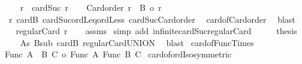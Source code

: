 \begin{isabellebody}
\ \ \isamarkupfalse%
\ {\isacharquery}{\kern0pt}r{\isacharprime}{\kern0pt}\ {\isacharequal}{\kern0pt}\ {\isachardoublequoteopen}cardSuc\ r{\isachardoublequoteclose}\isanewline
\ \ \isamarkupfalse%
\ {\isachardoublequoteopen}Card{\isacharunderscore}{\kern0pt}order\ {\isacharquery}{\kern0pt}r{\isacharprime}{\kern0pt}\ {\isasymand}\ {\isacharbar}{\kern0pt}B{\isacharbar}{\kern0pt}\ {\isacharless}{\kern0pt}o\ {\isacharquery}{\kern0pt}r{\isacharprime}{\kern0pt}{\isachardoublequoteclose}\isanewline
\ \ \isamarkupfalse%
\ r\ cardB\ cardSuc{\isacharunderscore}{\kern0pt}ordLeq{\isacharunderscore}{\kern0pt}ordLess\ cardSuc{\isacharunderscore}{\kern0pt}Card{\isacharunderscore}{\kern0pt}order\isanewline
\ \ card{\isacharunderscore}{\kern0pt}of{\isacharunderscore}{\kern0pt}Card{\isacharunderscore}{\kern0pt}order\ \isamarkupfalse%
\ blast\isanewline
\ \ \isamarkupfalse%
\ \isamarkupfalse%
\ {\isachardoublequoteopen}regularCard\ {\isacharquery}{\kern0pt}r{\isacharprime}{\kern0pt}{\isachardoublequoteclose}\isanewline
\ \ \isamarkupfalse%
\ assms\ \isamarkupfalse%
{\isacharparenleft}{\kern0pt}simp\ add{\isacharcolon}{\kern0pt}\ infinite{\isacharunderscore}{\kern0pt}cardSuc{\isacharunderscore}{\kern0pt}regularCard{\isacharparenright}{\kern0pt}\isanewline
\ \ \isamarkupfalse%
\ \isamarkupfalse%
\ {\isacharquery}{\kern0pt}thesis\isanewline
\ \ \isamarkupfalse%
\ As\ Bsub\ cardB\ regularCard{\isacharunderscore}{\kern0pt}UNION\ \isamarkupfalse%
\ blast\isanewline
{}\isamarkupfalse%
%
\endisatagproof
{\isafoldproof}%
%
\isadelimproof
%
\endisadelimproof
%
\isadelimdocument
%
\endisadelimdocument
%
\isatagdocument
%
\isamarkuptrue%
%
\endisatagdocument
{\isafolddocument}%
%
\isadelimdocument
%
\endisadelimdocument
{}\isamarkupfalse%
\ card{\isacharunderscore}{\kern0pt}of{\isacharunderscore}{\kern0pt}Func{\isacharunderscore}{\kern0pt}Times{\isacharcolon}{\kern0pt}\isanewline
{\isachardoublequoteopen}{\isacharbar}{\kern0pt}Func\ {\isacharparenleft}{\kern0pt}A\ {\isasymtimes}\ B{\isacharparenright}{\kern0pt}\ C{\isacharbar}{\kern0pt}\ {\isacharequal}{\kern0pt}o\ {\isacharbar}{\kern0pt}Func\ A\ {\isacharparenleft}{\kern0pt}Func\ B\ C{\isacharparenright}{\kern0pt}{\isacharbar}{\kern0pt}{\isachardoublequoteclose}\isanewline
%
\isadelimproof
%
\endisadelimproof
%
\isatagproof
{}\isamarkupfalse%
\ card{\isacharunderscore}{\kern0pt}of{\isacharunderscore}{\kern0pt}ordIso{\isacharbrackleft}{\kern0pt}symmetric{\isacharbrackright}{\kern0pt}\isanewline

\end{isabellebody}
